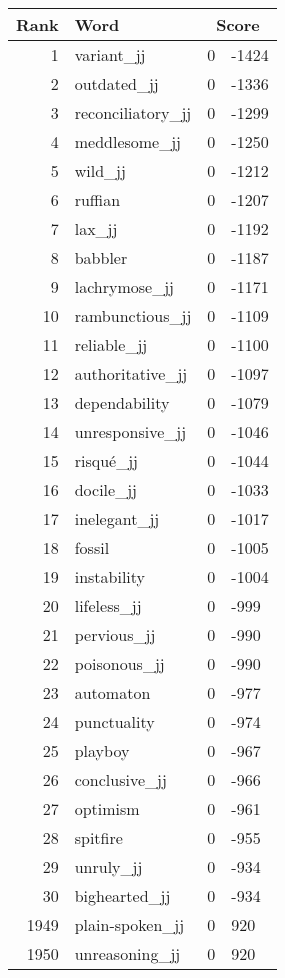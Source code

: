 \begin{longtable}[!htbp]{| rlr@{.}l |}
    \hline
    \textbf{Rank} & \textbf{Word} & \multicolumn{2}{c|}{\textbf{Score}} \\
    \hline
    \endhead
    1 & variant\_jj & 0 & -1424 \\
    2 & outdated\_jj & 0 & -1336 \\
    3 & reconciliatory\_jj & 0 & -1299 \\
    4 & meddlesome\_jj & 0 & -1250 \\
    5 & wild\_jj & 0 & -1212 \\
    6 & ruffian & 0 & -1207 \\
    7 & lax\_jj & 0 & -1192 \\
    8 & babbler & 0 & -1187 \\
    9 & lachrymose\_jj & 0 & -1171 \\
    10 & rambunctious\_jj & 0 & -1109 \\
    11 & reliable\_jj & 0 & -1100 \\
    12 & authoritative\_jj & 0 & -1097 \\
    13 & dependability & 0 & -1079 \\
    14 & unresponsive\_jj & 0 & -1046 \\
    15 & risqué\_jj & 0 & -1044 \\
    16 & docile\_jj & 0 & -1033 \\
    17 & inelegant\_jj & 0 & -1017 \\
    18 & fossil & 0 & -1005 \\
    19 & instability & 0 & -1004 \\
    20 & lifeless\_jj & 0 & -999 \\
    21 & pervious\_jj & 0 & -990 \\
    22 & poisonous\_jj & 0 & -990 \\
    23 & automaton & 0 & -977 \\
    24 & punctuality & 0 & -974 \\
    25 & playboy & 0 & -967 \\
    26 & conclusive\_jj & 0 & -966 \\
    27 & optimism & 0 & -961 \\
    28 & spitfire & 0 & -955 \\
    29 & unruly\_jj & 0 & -934 \\
    30 & bighearted\_jj & 0 & -934 \\
    1949 & plain-spoken\_jj & 0 & 920 \\
    1950 & unreasoning\_jj & 0 & 920 \\

\end{longtable}
